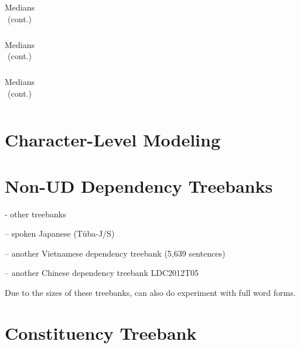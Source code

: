 \documentclass[11pt,letterpaper]{article}
\begin{document}
\begin{table}
\begin{longtable}{ccccccccccccccclll}

\end{longtable}
	\caption{Medians (cont.)}
\end{table}

\begin{table}
\begin{longtable}{ccccccccccccccclll}

\end{longtable}
	\caption{Medians (cont.)}
\end{table}

\begin{table}
\begin{longtable}{ccccccccccccccclll}

\end{longtable}
	\caption{Medians (cont.)}
\end{table}





%
%
%



\section{Character-Level Modeling}

\section{Non-UD Dependency Treebanks}



- other treebanks



-- spoken Japanese (T{\"u}ba-J/S)

-- another Vietnamese dependency treebank \citep{nguyen-bktreebank:-2017} (5,639 sentences)


-- another Chinese dependency treebank LDC2012T05


Due to the sizes of these treebanks, can also do experiment with full word forms.


\section{Constituency Treebank}
\end{document}
